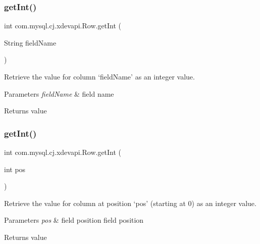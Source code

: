 \subsubsection{\texorpdfstring{get\+Int()}{getInt()}\hspace{0.1cm}{\footnotesize\ttfamily [1/2]}}
{\footnotesize\ttfamily int com.\+mysql.\+cj.\+xdevapi.\+Row.\+get\+Int (\begin{DoxyParamCaption}\item[{String}]{field\+Name }\end{DoxyParamCaption})}

Retrieve the value for column `field\+Name' as an integer value.


\begin{DoxyParams}{Parameters}
{\em field\+Name} & field name \\
\hline
\end{DoxyParams}
\begin{DoxyReturn}{Returns}
value 
\end{DoxyReturn}
\mbox{\label{interfacecom_1_1mysql_1_1cj_1_1xdevapi_1_1_row_a2a2d2a39eed96b8f879fc2f8873b3cb9}} 
\subsubsection{\texorpdfstring{get\+Int()}{getInt()}\hspace{0.1cm}{\footnotesize\ttfamily [2/2]}}
{\footnotesize\ttfamily int com.\+mysql.\+cj.\+xdevapi.\+Row.\+get\+Int (\begin{DoxyParamCaption}\item[{int}]{pos }\end{DoxyParamCaption})}

Retrieve the value for column at position `pos' (starting at 0) as an integer value.


\begin{DoxyParams}{Parameters}
{\em pos} & field position field position \\
\hline
\end{DoxyParams}
\begin{DoxyReturn}{Returns}
value 
\end{DoxyReturn}
\mbox{\label{interfacecom_1_1mysql_1_1cj_1_1xdevapi_1_1_row_a8bd4e08495b03dc8c25bd4d39c82c9dd}} 
